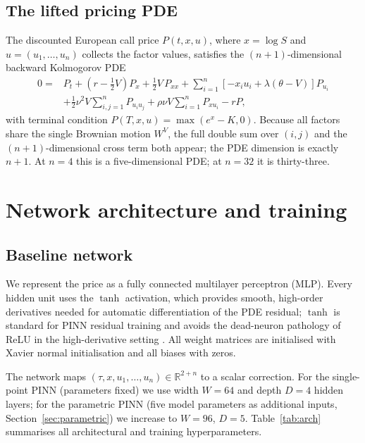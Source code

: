 \documentclass[review,12pt]{elsarticle}
\begin{document}
\subsection{The lifted pricing PDE}
The discounted European call price $P(t,x,u)$, where $x=\log S$ and
$u=(u_1,\ldots,u_n)$ collects the factor values, satisfies the
$(n{+}1)$-dimensional backward Kolmogorov PDE
\begin{align}
  0 = {}& P_t + \!\left(r-\tfrac12 V\right)P_x + \tfrac12 V\,P_{xx}
         + \sum_{i=1}^{n}\!\left[-x_i u_i + \lambda(\theta-V)\right]P_{u_i}
         \nonumber\\
        & + \tfrac12\nu^2 V\sum_{i,j=1}^{n}P_{u_i u_j}
         + \rho\nu V\sum_{i=1}^{n} P_{x u_i} - rP ,
  \label{eq:pde}
\end{align}
with terminal condition $P(T,x,u)=\max(e^x - K, 0)$.
Because all factors share the single Brownian motion $W^V$, the full
double sum over $(i,j)$ and the $(n{+}1)$-dimensional cross term both appear;
the PDE dimension is exactly $n{+}1$.  At $n{=}4$ this is a five-dimensional
PDE; at $n{=}32$ it is thirty-three.

\section{Network architecture and training}
\label{sec:arch}

\subsection{Baseline network}
We represent the price as a fully connected multilayer perceptron (MLP).  Every
hidden unit uses the $\tanh$ activation, which provides smooth, high-order
derivatives needed for automatic differentiation of the PDE residual; $\tanh$ is
standard for PINN residual training and avoids the dead-neuron pathology of ReLU
in the high-derivative setting \citep{raissi2019physics}.  All weight matrices are
initialised with Xavier normal initialisation \citep{glorot2010understanding}
and all biases with zeros.

The network maps
$(\tau, x, u_1,\ldots,u_n) \in \mathbb{R}^{2+n}$ to a scalar correction.  For the
single-point PINN (parameters fixed) we use width $W{=}64$ and depth $D{=}4$ hidden
layers; for the parametric PINN (five model parameters as additional inputs,
Section~\ref{sec:parametric}) we increase to $W{=}96$, $D{=}5$.
Table~\ref{tab:arch} summarises all architectural and training hyperparameters.
\end{document}
